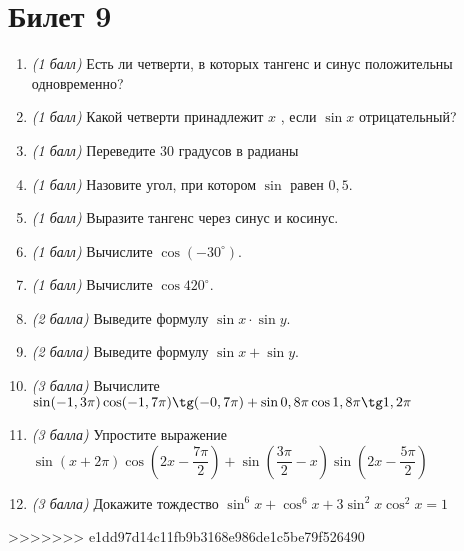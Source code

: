 \documentclass[12pt, a4paper]{article}
\begin{document}
\section*{Билет 9}
\begin{enumerate}
	\item \textit{(1 балл)}	Есть ли четверти, в которых тангенс и синус положительны одновременно? 
	\item \textit{(1 балл)}	Какой четверти принадлежит $x$ , если $\sin x$ отрицательный?
	\item \textit{(1 балл)}	Переведите 30 градусов в радианы
	\item \textit{(1 балл)}	Назовите угол, при котором $\sin$  равен $0,5$.
	\item \textit{(1 балл)}	Выразите тангенс через синус и косинус.
	\item \textit{(1 балл)} Вычислите $\cos (-30^{\circ})$.
	\item \textit{(1 балл)}	Вычислите $\cos 420^{\circ}$.
	\item \textit{(2 балла)} Выведите формулу $\sin x \cdot \sin y$.
	\item \textit{(2 балла)} Выведите формулу $\sin x + \sin y$.
	\item \textit{(3 балла)} Вычислите $\sin (-1,3\pi) \cos (-1,7 \pi) \tg (-0,7\pi)+ \sin 0,8\pi \cos 1,8 \pi \tg 1,2 \pi$
	\item \textit{(3 балла)} Упростите выражение $\sin (x+2\pi) \cos (2x-\dfrac{7\pi}{2})+ \sin (\dfrac{3\pi}{2}-x) \sin (2x - \dfrac{5\pi}{2})$
	\item \textit{(3 балла)} Докажите тождество $\sin^6x + \cos^6x + 3\sin^2x\cos^2x = 1$
\end{enumerate}
>>>>>>> e1dd97d14c11fb9b3168e986de1c5be79f526490
\end{document}
